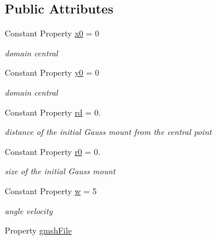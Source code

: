 \subsection*{Public Attributes}
\begin{DoxyCompactItemize}
\item 
Constant Property \hyperlink{class_adv_rotation_hybrid_mesh2d_a0b5b5cd98f5acfe3c681516cbbc15eac}{x0} = 0
\begin{DoxyCompactList}\small\item\em domain central \end{DoxyCompactList}\item 
Constant Property \hyperlink{class_adv_rotation_hybrid_mesh2d_ab815c80c7f05950970ad4f7682c3453c}{y0} = 0
\begin{DoxyCompactList}\small\item\em domain central \end{DoxyCompactList}\item 
Constant Property \hyperlink{class_adv_rotation_hybrid_mesh2d_a11ea9fcffa62d7a1dab28e32adebf47b}{rd} = 0.
\begin{DoxyCompactList}\small\item\em distance of the initial Gauss mount from the central point \end{DoxyCompactList}\item 
Constant Property \hyperlink{class_adv_rotation_hybrid_mesh2d_a3f9d553859b8e0b3d3bde61ea12c628b}{r0} = 0.
\begin{DoxyCompactList}\small\item\em size of the initial Gauss mount \end{DoxyCompactList}\item 
Constant Property \hyperlink{class_adv_rotation_hybrid_mesh2d_a4f8367ec7e10d46d002d3d13df5ab8fe}{w} = 5
\begin{DoxyCompactList}\small\item\em angle velocity \end{DoxyCompactList}\item 
Property \hyperlink{class_adv_rotation_hybrid_mesh2d_a80391753aa41cdb5609d8976a451cd4a}{gmsh\+File}
\end{DoxyCompactItemize}
